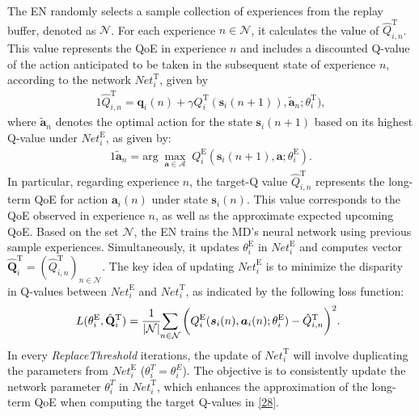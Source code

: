 \documentclass[12pt,draftclsnofoot,onecolumn]{IEEEtran}
\begin{document}
The EN randomly selects a sample collection of experiences from the replay buffer, denoted as $\mathcal{N}$. For each experience $n \in \mathcal{N}$, it calculates the value of $	\hat{Q}^{\text{T}}_{i,n}$. This value represents the QoE in experience $n$ and includes a discounted Q-value of the action anticipated to be taken in the subsequent state of experience $n$, according to the network $\textit{Net}^\text{T}_i$, given by
\begin{alignat}{1}
	\hat{Q}_{i,n}^{\text{T}} = \boldsymbol{q}_i(n) + \gamma Q_i^{\text{T}}(\boldsymbol{s}_i(n+1)), \tilde{\boldsymbol{a}}_n; \theta_i^{\text{T}}),
	\label{28}  
\end{alignat}  
where $\tilde{\boldsymbol{a}}_n$ denotes the optimal action for the state $\boldsymbol{s}_i(n+1)$ based on its highest Q-value under $\textit{Net}_i^{\text{E}}$, as given by:
\begin{alignat}{1}
	\tilde{\boldsymbol{a}}_n = \text{arg} \; \max_{\boldsymbol{a} \in \mathcal{A}} \; Q_i^{\text{E}}(\boldsymbol{s}_i(n+1), \boldsymbol{a}; \theta_i^{\text{E}}).
	\label{29}  
\end{alignat} 
In particular, regarding experience $n$, the target-Q value $\hat{Q}_{i,n}^{\text{T}}$ represents the long-term QoE for action $\boldsymbol{a}_i(n)$ under state $\boldsymbol{s}_i(n)$. This value corresponds to the QoE observed in experience $n$, as well as the approximate expected upcoming QoE. %
Based on the set $\mathcal{N}$, the EN trains the MD's neural network using previous sample experiences. Simultaneously, it updates $\theta^{\text{E}}_i$ in $\textit{Net}_i^{\text{E}}$ and computes vector $\hat{\mathbf{Q}}_i^{\text{T}} = (\hat{Q}^{\text{T}}_{i,n})_{n \in \mathcal{N}}$. The key idea of updating $\textit{Net}_i^{\text{E}}$ is to minimize the disparity in Q-values between $\textit{Net}_i^{\text{E}}$ and $\textit{Net}_i^{\text{T}}$, as indicated by the following loss function:
\begin{alignat}{1}
	\hspace{-2mm}L(\theta_i^{\text{E}},\hat{\mathbf{Q}}_i^{\text{T}}) = {1 \over |\mathcal{N}| }\hspace{-1mm} \sum\limits_{n \in \mathcal{N}} \bigg(Q_i^{\text{E}}(\boldsymbol{s}_i(n) , \boldsymbol{a}_i(n); \theta_i^{\text{E}} ) -   \hat{Q}^{\text{T}}_{i,n}  \bigg)^2.
	\label{30}  
\end{alignat}  
In every \textit{ReplaceThreshold} iterations, the update of $\textit{Net}_i^{\text{T}}$ will involve duplicating the parameters from $\textit{Net}_i^{\text{E}}$ ($\theta_i^{T} = \theta_i^{E}$). The objective is to consistently update the network parameter $\theta_i^{T}$ in $\textit{Net}_i^{\text{T}}$, which enhances the approximation of the long-term QoE when computing the target Q-values in \eqref{28}.\\
\end{document}

